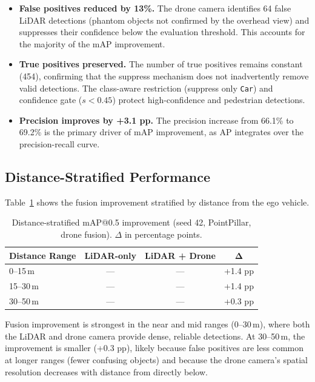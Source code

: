\documentclass[sustainability,article,submit,moreauthors,pdftex]{Definitions/mdpi}
\begin{document}
\begin{itemize}[leftmargin=*,labelsep=5.8mm]
\item \textbf{False positives reduced by 13\%.} The drone camera identifies 64 false LiDAR detections (phantom objects not confirmed by the overhead view) and suppresses their confidence below the evaluation threshold. This accounts for the majority of the mAP improvement.
\item \textbf{True positives preserved.} The number of true positives remains constant (454), confirming that the suppress mechanism does not inadvertently remove valid detections. The class-aware restriction (suppress only \texttt{Car}) and confidence gate ($s < 0.45$) protect high-confidence and pedestrian detections.
\item \textbf{Precision improves by +3.1 pp.} The precision increase from 66.1\% to 69.2\% is the primary driver of mAP improvement, as AP integrates over the precision-recall curve.
\end{itemize}

\subsection{Distance-Stratified Performance}\label{sec:distance}

Table~\ref{tab:distance} shows the fusion improvement stratified by distance from the ego vehicle.

\begin{table}[H]
\caption{Distance-stratified mAP@0.5 improvement (seed 42, PointPillar, drone fusion). $\Delta$ in percentage points.}\label{tab:distance}
\centering
\begin{tabular}{lccc}
\toprule
\textbf{Distance Range} & \textbf{LiDAR-only} & \textbf{LiDAR + Drone} & $\bm{\Delta}$ \\
\midrule
0--15\,m  & --- & --- & +1.4 pp \\
15--30\,m & --- & --- & +1.4 pp \\
30--50\,m & --- & --- & +0.3 pp \\
\bottomrule
\end{tabular}
\end{table}

Fusion improvement is strongest in the near and mid ranges (0--30\,m), where both the LiDAR and drone camera provide dense, reliable detections. At 30--50\,m, the improvement is smaller (+0.3 pp), likely because false positives are less common at longer ranges (fewer confusing objects) and because the drone camera's spatial resolution decreases with distance from directly below.
\end{document}
